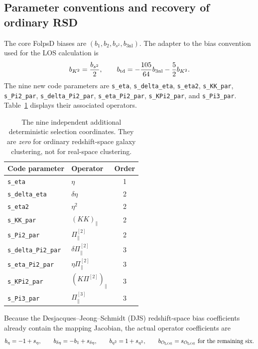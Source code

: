 \documentclass[11pt,a4paper]{article}
\begin{document}
\subsection{Parameter conventions and recovery of ordinary RSD}
The core FolpsD biases are $(b_1,b_2,b_{s^2},b_{3\mathrm{nl}})$. The adapter to the bias convention used for the LOS calculation is
\begin{equation}
 b_{K^2}=\frac{b_{s^2}}2,\qquad
 b_{\rm td}=-\frac{105}{64}b_{3\rm nl}-\frac52 b_{K^2}.
\end{equation}
The nine new code parameters are \texttt{s\_eta}, \texttt{s\_delta\_eta}, \texttt{s\_eta2}, \texttt{s\_KK\_par}, \texttt{s\_Pi2\_par}, \texttt{s\_delta\_Pi2\_par}, \texttt{s\_eta\_Pi2\_par}, \texttt{s\_KPi2\_par}, and \texttt{s\_Pi3\_par}. Table~\ref{tab:sel} displays their associated operators.
\begin{table}[htbp]\centering\small
\begin{tabularx}{\linewidth}{@{}lXc@{}}\toprule
Code parameter & Operator & Order\\\midrule
\texttt{s\_eta} & $\eta$ & 1\\
\texttt{s\_delta\_eta} & $\delta\eta$ & 2\\
\texttt{s\_eta2} & $\eta^2$ & 2\\
\texttt{s\_KK\_par} & $(KK)_\parallel$ & 2\\
\texttt{s\_Pi2\_par} & $\Pi^{[2]}_\parallel$ & 2\\
\texttt{s\_delta\_Pi2\_par} & $\delta\Pi^{[2]}_\parallel$ & 3\\
\texttt{s\_eta\_Pi2\_par} & $\eta\Pi^{[2]}_\parallel$ & 3\\
\texttt{s\_KPi2\_par} & $(K\Pi^{[2]})_\parallel$ & 3\\
\texttt{s\_Pi3\_par} & $\Pi^{[3]}_\parallel$ & 3\\\bottomrule
\end{tabularx}
\caption{The nine independent additional deterministic selection coordinates. They are \emph{zero} for ordinary redshift-space galaxy clustering, not for real-space clustering.}\label{tab:sel}\end{table}
Because the Desjacques--Jeong--Schmidt (DJS) redshift-space bias coefficients already contain the mapping Jacobian, the actual operator coefficients are
\begin{equation}\label{eq:mapping}
 b_\eta=-1+s_\eta,\qquad b_{\delta\eta}=-b_1+s_{\delta\eta},\qquad
 b_{\eta^2}=1+s_{\eta^2},\qquad b_{O_{\rm LOS}}=s_{O_{\rm LOS}}\ \text{for the remaining six}.
\end{equation}
\end{document}
